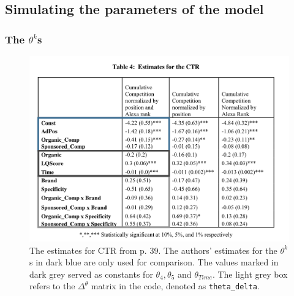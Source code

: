 \newpage
\subsection{Simulating the parameters of the model}
\subsubsection{The $\theta^k$s}
\begin{figure}
    \centering
    \includegraphics[scale=0.35]{table4}
    \caption{The estimates for CTR from p. 39. The authors' estimates for the $\theta^k$s in dark blue are only used for comparison. The values marked in dark grey served as constants for $\theta_4, \theta_5$ and $\theta_{Time}$. The light grey box refers to the $\Delta^{\theta}$ matrix in the code, denoted as \texttt{theta\_delta}\protect\footnotemark.}
    \label{fig:table4}
\end{figure}

